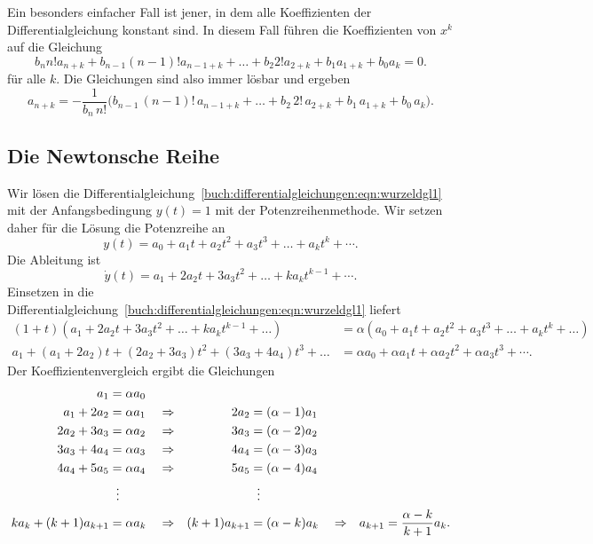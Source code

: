 Ein besonders einfacher Fall ist jener, in dem alle Koeffizienten der
Differentialgleichung konstant sind. 
In diesem Fall führen die Koeffizienten von $x^k$ auf die Gleichung
\begin{equation}
b_n n! a_{n+k} + b_{n-1} (n-1)! a_{n-1+k}
+ \dots +
b_2 2! a_{2+k} + b_1 a_{1+k} + b_0 a_{k} = 0.
\label{buch:differntialgleichungen:eqn:kterm}
\end{equation}
für alle $k$.
Die Gleichungen sind also immer lösbar und ergeben
\[
a_{n+k}
=
-
\frac{1}{b_n\,n!}\bigl(
b_{n-1}\,(n-1)!\,a_{n-1+k} + \dots + 
b_2\,2!\,a_{2+k} + b_1\, a_{1+k} + b_0\, a_k
\bigr).
\]



%
%
\subsection{Die Newtonsche Reihe
\label{buch:differentialgleichungen:subsection:newtonschereihe}}
Wir lösen die
Differentialgleichung~\eqref{buch:differentialgleichungen:eqn:wurzeldgl1}
mit der Anfangsbedingung $y(t)=1$ mit der Potenzreihenmethode.
Wir setzen daher für die Lösung die Potenzreihe an
\[
y(t)
=
a_0 + a_1t + a_2t^2 + a_3t^3 + \dots + a_kt^k + \cdots.
\]
Die Ableitung ist
\[
\dot{y}(t)
=
a_1 + 2a_2t + 3a_3t^2 + \dots  + ka_kt^{k-1} + \cdots .
\]
Einsetzen in die 
Differentialgleichung~\eqref{buch:differentialgleichungen:eqn:wurzeldgl1}
liefert
\begin{align*}
(1+t)
(
a_1 + 2a_2t + 3a_3t^2 + \dots  + ka_kt^{k-1} + \dots
)
&=
\alpha
(
a_0 + a_1t + a_2t^2 + a_3t^3 + \dots + a_kt^k + \dots
)
\\
a_1
+(a_1+2a_2)t
+(2a_2+3a_3)t^2
+(3a_3+4a_4)t^3
+\dots
&=
\alpha a_0 + \alpha a_1t + \alpha a_2t^2 + \alpha a_3t^3 + \cdots.
\end{align*}
Der Koeffizientenvergleich ergibt die Gleichungen
\begin{align}
a_1&=\alpha a_0
\notag
\\
a_1+2a_2 &= \alpha a_1 &&\Rightarrow& 2a_2 &= (\alpha-1) a_1
\notag
\\
2a_2+3a_3 &= \alpha a_2&&\Rightarrow& 3a_3 &= (\alpha-2) a_2
\notag
\\
3a_3+4a_4 &= \alpha a_3&&\Rightarrow& 4a_4 &= (\alpha-3) a_3
\notag
\\
4a_4+5a_5 &= \alpha a_4&&\Rightarrow& 5a_5 &= (\alpha-4) a_4
\notag
\\
&\hspace*{2mm}\vdots
&&&&\hspace*{2mm}\vdots
\notag
\\
ka_k+(k+1)a_{k+1}&=\alpha a_k
&&\Rightarrow& (k+1)a_{k+1} &= (\alpha-k) a_k
&&\Rightarrow&
a_{k+1} = \frac{\alpha-k}{k+1}a_k.
\label{buch:differentialgleichungen:eqn:newtonreiherekursion}
\end{align}
